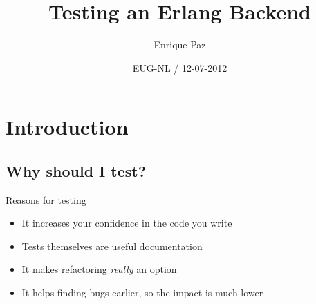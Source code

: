\documentclass[aspectratio=169]{beamer}
\title[]{\alert{Testing an Erlang Backend}}
\author[] %
{Enrique Paz}
\institute[] %
{Senior Backend Developer @ Team Services}
\date[] %
{EUG-NL / 12-07-2012}
\begin{document}
\begin{frame}
  \titlepage
\end{frame}


\section{Introduction}

\subsection*{Why should I test?}
\label{why_should_i_test}

\begin{frame}{Reasons for testing}
    \begin{itemize}
    \item It increases your confidence in the code you write
    \item Tests themselves are useful documentation
    \item It makes refactoring \emph{really} an option
    \item It helps finding bugs earlier, so the impact is much lower
    \end{itemize}
\end{frame}
\end{document}
